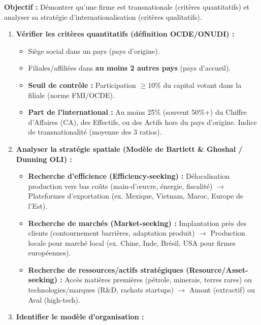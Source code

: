 \documentclass[11pt]{article}
\newcommand{\cle}[1]{{\popxbold\color{popdark}#1}}
\begin{document}
\begin{methode}
    \textbf{Objectif :} Démontrer qu'une firme est transnationale (critères quantitatifs) et analyser sa stratégie d'internationalisation (critères qualitatifs).
    \begin{enumerate}
        \item \textbf{Vérifier les critères quantitatifs (définition OCDE/ONUDI) :}
            \begin{itemize}
                \item Siège social dans un pays (pays d'origine).
                \item Filiales/affiliées dans \textbf{au moins 2 autres pays} (pays d'accueil).
                \item \textbf{Seuil de contrôle :} Participation $\ge 10\%$ du capital votant dans la filiale (norme FMI/OCDE).
                \item \textbf{Part de l'international :} Au moins 25\% (souvent 50\%+) du Chiffre d'Affaires (CA), des Effectifs, ou des Actifs hors du pays d'origine. \cle{Indice de transnationalité} (moyenne des 3 ratios).
            \end{itemize}
        \item \textbf{Analyser la stratégie spatiale (Modèle de Bartlett \& Ghoshal / Dunning OLI) :}
            \begin{itemize}
                \item \textbf{Recherche d'efficience (Efficiency-seeking) :} Délocalisation production vers bas coûts (main-d'œuvre, énergie, fiscalité) $\rightarrow$ \cle{Plateformes d'exportation} (ex. Mexique, Vietnam, Maroc, Europe de l'Est).
                \item \textbf{Recherche de marchés (Market-seeking) :} Implantation près des clients (contournement barrières, adaptation produit) $\rightarrow$ \cle{Production locale pour marché local} (ex. Chine, Inde, Brésil, USA pour firmes européennes).
                \item \textbf{Recherche de ressources/actifs stratégiques (Resource/Asset-seeking) :} Accès matières premières (pétrole, minerais, terres rares) ou technologies/marques (R\&D, rachats startups) $\rightarrow$ \cle{Amont (extractif) ou Aval (high-tech)}.
            \end{itemize}
        \item \textbf{Identifier le modèle d'organisation :}
            \begin{itemize}

\end{itemize}
\end{enumerate}
\end{methode}
\end{document}
